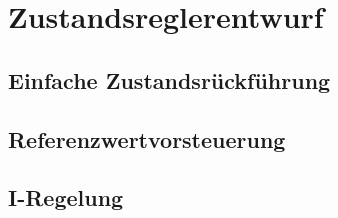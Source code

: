 \section{Zustandsreglerentwurf} \label{sec:Zustandsreglerentwurf}

\subsection{Einfache Zustandsrückführung} \label{sec:Einfach}

\subsection{Referenzwertvorsteuerung} \label{sec:Referenzwertvorsteuerung}

\subsection{I-Regelung} \label{sec:Iregler}